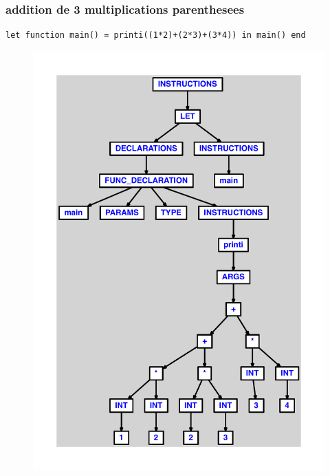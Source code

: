 \documentclass{article}
\begin{document}
\subsubsection{addition de 3 multiplications parenthesees}
\begin{lstlisting}
let function main() = printi((1*2)+(2*3)+(3*4)) in main() end
\end{lstlisting}
\newpage
\begin{figure}[H]
\centering
\includegraphics[max width=\textwidth]{ast/ast_108.pdf}
\end{figure}
\newpage
\end{document}
